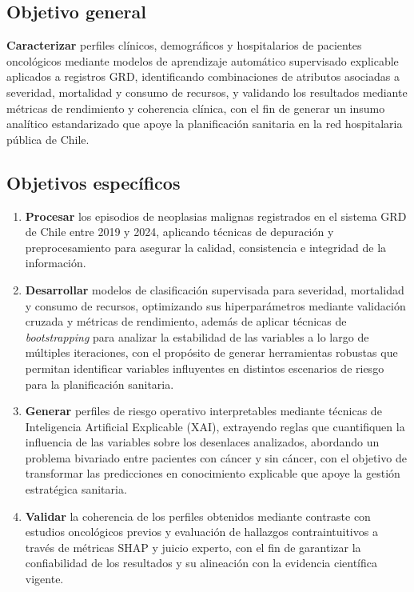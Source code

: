 \subsection{Objetivo general}

\textbf{Caracterizar} perfiles clínicos, demográficos y hospitalarios de pacientes oncológicos mediante modelos de aprendizaje automático supervisado explicable aplicados a registros GRD, identificando combinaciones de atributos asociadas a severidad, mortalidad y consumo de recursos, y validando los resultados mediante métricas de rendimiento y coherencia clínica, con el fin de generar un insumo analítico estandarizado que apoye la planificación sanitaria en la red hospitalaria pública de Chile.

\subsection{Objetivos espec\'ificos}
\label{objetivos_especificos}
\begin{enumerate}
	\item \textbf{Procesar} los episodios de neoplasias malignas registrados en el sistema GRD de Chile entre 2019 y 2024, aplicando técnicas de depuración y preprocesamiento para asegurar la calidad, consistencia e integridad de la información.
	\item \textbf{Desarrollar} modelos de clasificación supervisada para severidad, mortalidad y consumo de recursos, optimizando sus hiperparámetros mediante validación cruzada y métricas de rendimiento, además de aplicar técnicas de \textit{bootstrapping} para analizar la estabilidad de las variables a lo largo de múltiples iteraciones, con el propósito de generar herramientas robustas que permitan identificar variables influyentes en distintos escenarios de riesgo para la planificación sanitaria.
	\item \textbf{Generar} perfiles de riesgo operativo interpretables mediante técnicas de Inteligencia Artificial Explicable (XAI), extrayendo reglas que cuantifiquen la influencia de las variables sobre los desenlaces analizados, abordando un problema bivariado entre pacientes con cáncer y sin cáncer, con el objetivo de transformar las predicciones en conocimiento explicable que apoye la gestión estratégica sanitaria.
	\item \textbf{Validar} la coherencia de los perfiles obtenidos mediante contraste con estudios oncológicos previos y evaluación de hallazgos contraintuitivos a través de métricas SHAP y juicio experto, con el fin de garantizar la confiabilidad de los resultados y su alineación con la evidencia científica vigente.
\end{enumerate}

